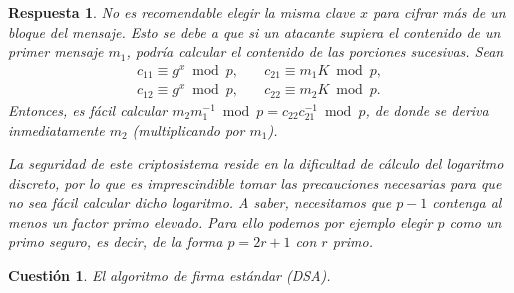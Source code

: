 \documentclass[
  a4paper,
  spanish,
  12pt,
]{scrartcl}
\theoremstyle{ejercicio-style}
\newtheorem{ejer}{Cuestión}
\theoremstyle{remark-style}
\newtheorem*{sol}{Respuesta}
\theoremstyle{teorema-style}
\begin{document}
\begin{sol}
No es recomendable elegir la misma clave $x$ para cifrar más de un bloque del mensaje. Esto se debe a que si un atacante supiera el contenido de un primer mensaje \(m_{1}\), podría calcular el contenido de las porciones sucesivas. Sean
\begin{align*}
c_{11}\equiv g^x \bmod{p}, \quad& c_{21}\equiv m_{1}K\bmod{p}, \\
c_{12}\equiv g^x \bmod{p}, \quad& c_{22}\equiv m_{2}K\bmod{p}.
\end{align*}
Entonces, es fácil calcular \(m_2m_1^{-1} \bmod p = c_{22}c_{21}^{-1} \bmod{p}\), de donde se deriva inmediatamente \(m_{2}\) (multiplicando por \(m_{1}\)).

La seguridad de este criptosistema reside en la dificultad de cálculo del logaritmo discreto, por lo que es imprescindible tomar las precauciones necesarias para que no sea fácil calcular dicho logaritmo. A saber, necesitamos que $p-1$ contenga al menos un factor primo elevado. Para ello podemos por ejemplo elegir $p$ como un \textit{primo seguro}, es decir, de la forma $p = 2r + 1$ con $r$ primo.
\end{sol}

\begin{ejer}
  El algoritmo de firma estándar (DSA).
  \label{q:8}
\end{ejer}
\end{document}
